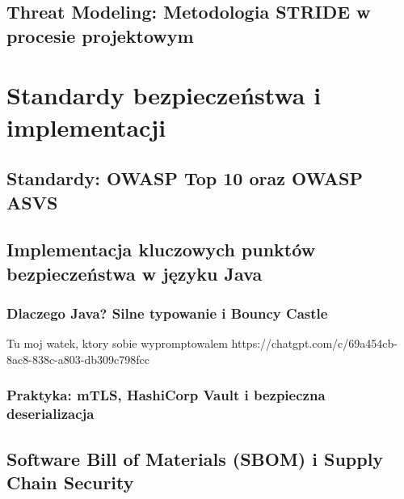 \documentclass[12pt,a4paper,oneside]{book}
\begin{document}
\section{Threat Modeling: Metodologia STRIDE w procesie projektowym}

\chapter{Standardy bezpieczeństwa i implementacji}

\section{Standardy: OWASP Top 10 oraz OWASP ASVS}
\section{Implementacja kluczowych punktów bezpieczeństwa w języku Java}
\subsection{Dlaczego Java? Silne typowanie i Bouncy Castle}
Tu moj watek, ktory sobie wypromptowalem
https://chatgpt.com/c/69a454cb-8ac8-838c-a803-db309c798fcc

\subsection{Praktyka: mTLS, HashiCorp Vault i bezpieczna deserializacja}
\section{Software Bill of Materials (SBOM) i Supply Chain Security}
\end{document}
